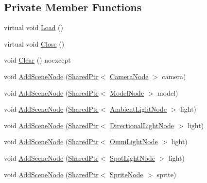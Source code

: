 \subsection*{Private Member Functions}
\begin{DoxyCompactItemize}
\item 
virtual void \hyperlink{classmage_1_1_scene_a1fb4a93eaa2f6a9e20594e205abb9a32}{Load} ()
\item 
virtual void \hyperlink{classmage_1_1_scene_a16786d7fcf0b813e2e94061b082cfd1d}{Close} ()
\item 
void \hyperlink{classmage_1_1_scene_adf4a5b3885e34336caa5f145f55e01e1}{Clear} () noexcept
\item 
void \hyperlink{classmage_1_1_scene_a4d7e96e51563f021894800faf6136a24}{Add\+Scene\+Node} (\hyperlink{namespacemage_a1e01ae66713838a7a67d30e44c67703e}{Shared\+Ptr}$<$ \hyperlink{classmage_1_1_camera_node}{Camera\+Node} $>$ camera)
\item 
void \hyperlink{classmage_1_1_scene_a26209907f771b99f1b3e5750d0a3e6f2}{Add\+Scene\+Node} (\hyperlink{namespacemage_a1e01ae66713838a7a67d30e44c67703e}{Shared\+Ptr}$<$ \hyperlink{classmage_1_1_model_node}{Model\+Node} $>$ model)
\item 
void \hyperlink{classmage_1_1_scene_a6d89db066e89a9a6eacc5e2568913c2b}{Add\+Scene\+Node} (\hyperlink{namespacemage_a1e01ae66713838a7a67d30e44c67703e}{Shared\+Ptr}$<$ \hyperlink{namespacemage_ab0783a7428706251f8561dc30a4d228d}{Ambient\+Light\+Node} $>$ light)
\item 
void \hyperlink{classmage_1_1_scene_a92db81d9abcbc953a2beb4060b3b08da}{Add\+Scene\+Node} (\hyperlink{namespacemage_a1e01ae66713838a7a67d30e44c67703e}{Shared\+Ptr}$<$ \hyperlink{namespacemage_a7637b5351fc0f66a10badd80ebb35899}{Directional\+Light\+Node} $>$ light)
\item 
void \hyperlink{classmage_1_1_scene_acca52e00f0f8c35ec8d48979ac1255ab}{Add\+Scene\+Node} (\hyperlink{namespacemage_a1e01ae66713838a7a67d30e44c67703e}{Shared\+Ptr}$<$ \hyperlink{namespacemage_a1724c6e6b6b5ba535cdd967cbbb4a669}{Omni\+Light\+Node} $>$ light)
\item 
void \hyperlink{classmage_1_1_scene_a52056b1b263c9ab070bc55af289edc3b}{Add\+Scene\+Node} (\hyperlink{namespacemage_a1e01ae66713838a7a67d30e44c67703e}{Shared\+Ptr}$<$ \hyperlink{namespacemage_aeed5dee4ff6c591eabb0e9114256df4a}{Spot\+Light\+Node} $>$ light)
\item 
void \hyperlink{classmage_1_1_scene_ace55464eab55ec30359c0ea6587c2201}{Add\+Scene\+Node} (\hyperlink{namespacemage_a1e01ae66713838a7a67d30e44c67703e}{Shared\+Ptr}$<$ \hyperlink{classmage_1_1_sprite_node}{Sprite\+Node} $>$ sprite)
\end{DoxyCompactItemize}

